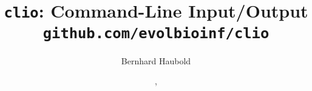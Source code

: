 \documentclass[a4paper]{article}
\begin{document}
\pagestyle{noweb}

\title{\texttt{clio}: Command-Line Input/Output\\
\small \texttt{github.com/evolbioinf/clio}}
\author{Bernhard Haubold}
\date{\!\!, }
\maketitle
\tableofcontents




\end{document}

